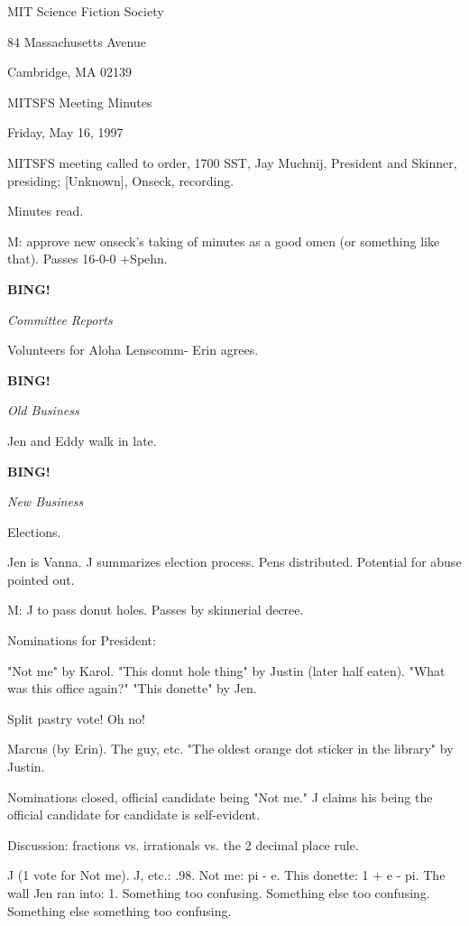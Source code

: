 \documentclass[12pt]{article}
\newcommand{\bing}{{\bf BING!} }
\newcommand{\goto}[1]{\bing \vskip 12pt \centerline{{\em{#1}}}}
\begin{document}
\begin{center}

MIT Science Fiction Society 

84 Massachusetts Avenue

Cambridge, MA 02139

\vspace{12pt}

MITSFS Meeting Minutes 

Friday, May 16, 1997

\end{center}
 
\vspace{18pt}

\setlength{\parskip}{6pt}

\noindent
MITSFS meeting called to order, 1700 SST,
Jay Muchnij, President and Skinner, presiding; [Unknown], Onseck, recording.

Minutes read.

M: approve new onseck's taking of minutes as a good omen (or something like that). Passes 16-0-0 +Spehn.

\goto{Committee Reports}

Volunteers for Aloha Lenscomm- Erin agrees.

\goto{Old Business}

Jen and Eddy walk in late.

\goto{New Business}

Elections.

Jen is Vanna. J summarizes election process. Pens distributed. Potential for abuse pointed out.

M: J to pass donut holes. Passes by skinnerial decree.

Nominations for President:

"Not me" by Karol. "This donut hole thing" by Justin (later half eaten). "What was this office again?" "This donette" by Jen.

Split pastry vote! Oh no!

Marcus (by Erin). The guy, etc. "The oldest orange dot sticker in the library" by Justin.

Nominations closed, official candidate being "Not me." J claims his being the official candidate for candidate is self-evident.

Discussion: fractions vs. irrationals vs. the 2 decimal place rule.

J (1 vote for Not me). J, etc.: .98. Not me: pi - e. This donette: 1 + e - pi. The wall Jen ran into: 1. Something too confusing. Something else too confusing. Something else something too confusing.
\end{document}

